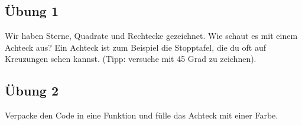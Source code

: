 \subsection*{Übung 1}
Wir haben Sterne, Quadrate und Rechtecke gezeichnet. Wie schaut es mit einem Achteck  aus? Ein Achteck ist zum Beispiel die Stopptafel, die du oft auf Kreuzungen sehen kannst.
(Tipp: versuche mit 45 Grad zu zeichnen).

\subsection*{Übung 2}
Verpacke den Code in eine Funktion und fülle das Achteck mit einer Farbe.

\newpage

